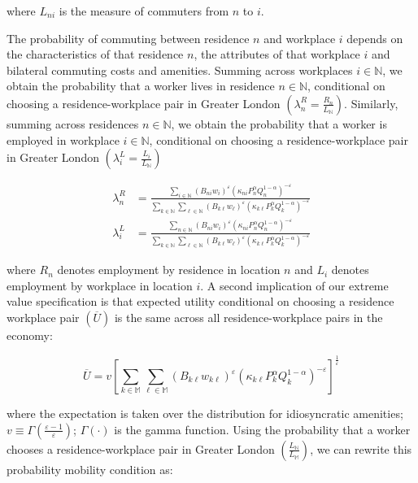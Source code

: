 where $L_{ni}$ is the measure of commuters from $n$ to $i$.

The probability of commuting between residence $n$ and workplace $i$ depends on the characteristics of that residence $n$, the attributes of that workplace $i$ and bilateral commuting costs and amenities. Summing across workplaces $i \in \mathbb{N}$, we obtain the probability that a worker lives in residence $n \in \mathbb{N}$, conditional on choosing a residence-workplace pair in Greater London $(\lambda_n^R = \frac{R_n}{L_{\mathbb{N}}})$. Similarly, summing across residences $n \in \mathbb{N}$, we obtain the probability that a worker is employed in workplace $i \in \mathbb{N}$, conditional on choosing a residence-workplace pair in Greater London $(\lambda_i^L = \frac{L_i}{L_{\mathbb{N}}})$

\begin{equation}
    \begin{aligned}
        \lambda_n^R & = \frac{\sum_{i \in \mathbb{N}} (B_{ni} w_i)^\varepsilon (\kappa_{ni} P_n^{\alpha} Q_n^{1 - \alpha})^{-\varepsilon}}{\sum_{k \in \mathbb{N}} \sum_{\ell \in \mathbb{N}} (B_{k\ell} w_{\ell})^{\varepsilon} (\kappa_{k\ell} P_k^{\alpha} Q_k^{1 - \alpha})^{-\varepsilon}     } \\
        \lambda_i^L & = \frac{\sum_{n \in \mathbb{N}} (B_{ni} w_i)^{\varepsilon} (\kappa_{ni} P_n^{\alpha} Q_n^{1 - \alpha})^{-\varepsilon}}{\sum_{k \in \mathbb{N}} \sum_{\ell \in \mathbb{N}} (B_{k\ell} w_{\ell})^{\varepsilon} (\kappa_{k\ell} P_k^{\alpha} Q_k^{1 - \alpha})^{-\varepsilon}}
    \end{aligned}
\end{equation}

where $R_n$ denotes employment by residence in location $n$ and $L_i$ denotes employment by workplace in location $i$. A second implication of our extreme value specification is that expected utility conditional on choosing a residence workplace pair $(\overline{U})$ is the same across all residence-workplace pairs in the economy:

\begin{equation}
    \overline{U} = v\left[ \sum_{k \in \mathbb{M}} \sum_{\ell \in \mathbb{M}} (B_{k\ell}w_{k\ell})^{\varepsilon} (\kappa_{k\ell} P_k^{\alpha} Q_k^{1 - \alpha})^{-\varepsilon} \right]^{\frac{1}{\varepsilon}} 
\end{equation}

where the expectation is taken over the distribution for idiosyncratic amenities; $v \equiv \Gamma(\frac{\varepsilon - 1}{\varepsilon})$; $\Gamma(\cdot)$ is the gamma function. Using the probability that a worker chooses a residence-workplace pair in Greater London $(\frac{L_{\mathbb{N}}}{L_{\mathbb{M}}})$, we can rewrite this probability mobility condition as:

